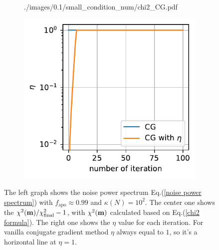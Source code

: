 \documentclass[11pt, letterpaper]{article}
\newcommand{\vbm}{\vb{m}}
\begin{document}
\begin{figure}[htb]
\begin{subfigure}{0.33\textwidth}
        {./images/0.1/small_condition_num/chi2_CG.pdf}
    \caption{}
    \label{small condi num chi2 CG}
\end{subfigure}%
\begin{subfigure}{0.33\textwidth}
    \centering
    \includegraphics[width=\linewidth]
        {./images/0.1/small_condition_num/eta_CG.pdf}
    \caption{}
    \label{small condi num eta CG}
\end{subfigure}
\caption{The left graph shows the noise power spectrum
    Eq.(\ref{noise power spectrum}) with $f_{\text{apo}} \approx 0.99$ and
    $\kappa(N) = 10^2$. The center one shows the
    $\chi^2(\vbm)/\chi^2_{\text{final}} - 1$, with $\chi^2(\vbm)$ calculated
    based on Eq.(\ref{chi2 formula}).
    The right one shows the $\eta$ value for each iteration. For vanilla 
    conjugate gradient method $\eta$ always equal to $1$, so it's a horizontal
    line at $\eta=1$.
}
\label{small condi num CG}
\end{figure}
\end{document}
